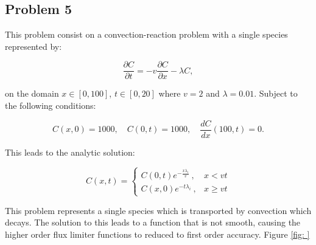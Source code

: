 \clearpage

\subsection{Problem 5}
This problem consist on a convection-reaction problem with a single species represented by:

\begin{equation}
    \frac{\partial C}{\partial t} = -v\frac{\partial C}{\partial x} - \lambda C,
\end{equation}

\noindent on the domain $x \in [0,100]$, $t \in [0,20]$ where $v = 2$ and $\lambda = 0.01$. Subject to the following conditions:

\begin{equation}
    C(x, 0) = 1000, \quad C(0,t) = 1000, \quad \frac{dC}{dx}(100, t) = 0.
\end{equation}

\noindent This leads to the analytic solution:

\begin{equation}
C (x,t) = \begin{cases}
  C (0, t) e^{-\frac{x \lambda _i}{v}}\ , & x < vt \\
  C (x, 0) e^{-t \lambda _i}\ , & x \ge vt
\end{cases}
\end{equation}

This problem represents a single species which is transported by convection which decays. The solution to this leads to a function that is not smooth, causing the higher order flux limiter functions to reduced to first order accuracy. Figure \ref{fig: }

